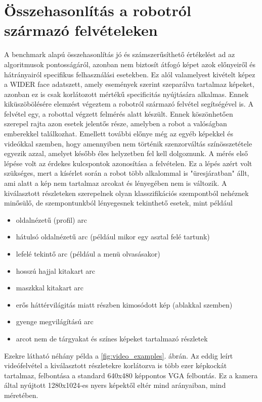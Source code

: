 \section{Összehasonlítás a robotról származó felvételeken}
A benchmark alapú összehasonlítás jó és számszerűsíthető értékelést ad az algoritmusok pontosságáról, azonban nem biztosít átfogó képet azok előnyeiről és hátrányairól specifikus felhasználási esetekben. Ez alól valamelyest kivételt képez a WIDER face adatszett, amely események szerint szeparálva tartalmaz képeket, azonban ez is csak korlátozott mértékű specificitás nyújtására alkalmas. Ennek kiküszöbölésére elemzést végeztem a robotról származó felvétel segítségével is. A felvétel egy, a robottal végzett felmérés alatt készült. Ennek köszönhetően szerepel rajta azon esetek jelentős része, amelyben a robot a valóságban emberekkel találkozhat. Emellett további előnye még az egyéb képekkel és videókkal szemben, hogy amennyiben nem történik szenzorváltás színösszetétele egyezik azzal, amelyet később éles helyzetben fel kell dolgoznunk. A mérés első lépése volt az érdekes kulcspontok azonosítása a felvételen. Ez a lépés azért volt szükséges, mert a kísérlet során a robot több alkalommal is "üresjáratban" állt, ami alatt a kép nem tartalmaz arcokat és lényegében nem is változik. A kiválasztott részleteken szerepelnek olyan klasszifikációs szempontból nehéznek minősülő, de szempontunkból lényegesnek tekinthető esetek, mint például
\begin{itemize}
    \item oldalnézetű (profil) arc
    \item hátulsó oldalnézetű arc (például mikor egy asztal felé tartunk)
    \item lefelé tekintő arc (például a menü olvasásakor)
    \item hosszú hajjal kitakart arc
    \item maszkkal kitakart arc
    \item erős háttérvilágitás miatt részben kimosódott kép (ablakkal szemben)
    \item gyenge megvilágítású arc
    \item arcot nem de tárgyakat és színes képeket tartalmazó részletek
\end{itemize}
Ezekre látható néhány példa a \ref{fig:video_examples}. ábrán. Az eddig leírt videófelvétel a kiválasztott részletekre korlátozva is több ezer képkockát tartalmaz, felbontása a standard 640x480 képpontos VGA felbontás. Ez a kamera által nyújtott 1280x1024-es nyers képektől eltér mind arányaiban, mind méretében.

